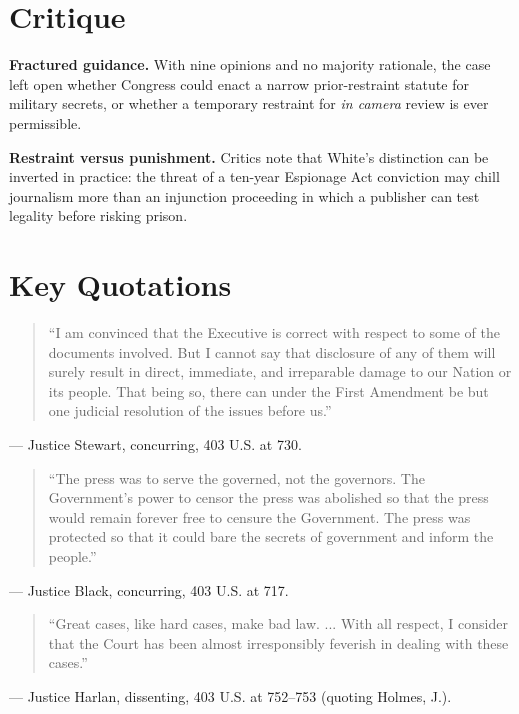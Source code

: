 \documentclass[12pt]{article}
\begin{document}
\section{Critique}

\textbf{Fractured guidance.} With nine opinions and no majority rationale, the case left open whether Congress could enact a narrow prior-restraint statute for military secrets, or whether a temporary restraint for \textit{in camera} review is ever permissible.

\textbf{Restraint versus punishment.} Critics note that White's distinction can be inverted in practice: the threat of a ten-year Espionage Act conviction may chill journalism more than an injunction proceeding in which a publisher can test legality before risking prison.

\section{Key Quotations}

\begin{quote}
``I am convinced that the Executive is correct with respect to some of the documents involved. But I cannot say that disclosure of any of them will surely result in direct, immediate, and irreparable damage to our Nation or its people. That being so, there can under the First Amendment be but one judicial resolution of the issues before us.''
\end{quote}
\noindent --- Justice Stewart, concurring, 403 U.S. at 730.

\begin{quote}
``The press was to serve the governed, not the governors. The Government's power to censor the press was abolished so that the press would remain forever free to censure the Government. The press was protected so that it could bare the secrets of government and inform the people.''
\end{quote}
\noindent --- Justice Black, concurring, 403 U.S. at 717.

\begin{quote}
``Great cases, like hard cases, make bad law. ... With all respect, I consider that the Court has been almost irresponsibly feverish in dealing with these cases.''
\end{quote}
\noindent --- Justice Harlan, dissenting, 403 U.S. at 752--753 (quoting Holmes, J.).
\end{document}
